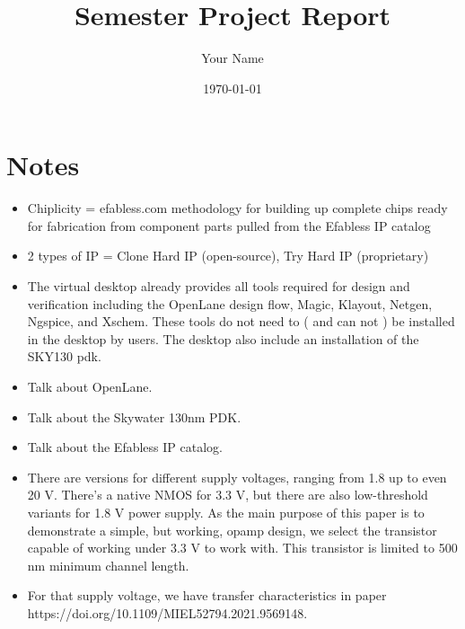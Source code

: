 \documentclass{report}
\begin{document}
\title{Semester Project Report}
\author{Your Name}
\date{\today}

\maketitle

\chapter*{Notes}
\begin{itemize}
    \item Chiplicity = efabless.com methodology for building up complete chips ready for fabrication from component parts pulled from the Efabless IP catalog
    \item 2 types of IP = Clone Hard IP (open-source), Try Hard IP (proprietary) 
    \item The virtual desktop already provides all tools required for design and verification including the OpenLane design flow, Magic, Klayout, Netgen, Ngspice, and Xschem.  These tools do not need to ( and can not ) be installed in the desktop by users.  The  desktop also include an installation of the SKY130 pdk.
    \item Talk about OpenLane.
    \item Talk about the Skywater 130nm PDK.
    \item Talk about the Efabless IP catalog.
    \item There are versions for different supply voltages, ranging from 1.8 up to even 20 V. There’s a native NMOS for 3.3 V, but there are also low-threshold variants for 1.8 V power supply. As the main purpose of this paper is to demonstrate a simple, but working, opamp design, we select the transistor capable of working under 3.3 V to work with. This transistor is limited to 500 nm minimum channel length.
    \item For that supply voltage, we have transfer characteristics in paper https://doi.org/10.1109/MIEL52794.2021.9569148.

\end{itemize}
\end{document}

